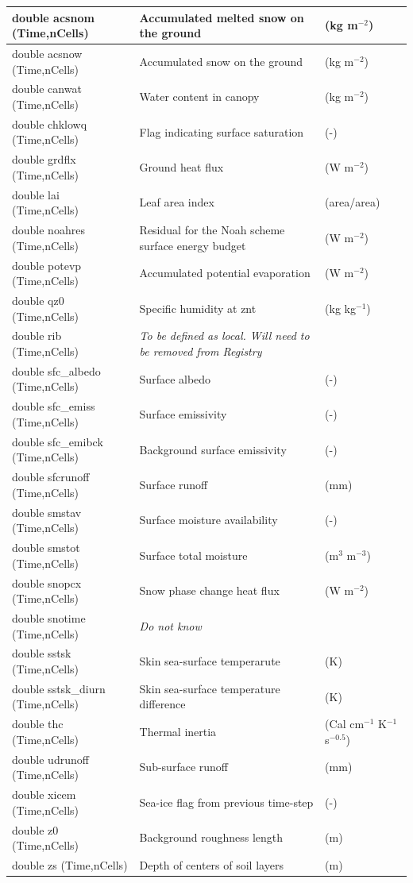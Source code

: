 \documentclass[11pt]{report}
\begin{document}
{\small
\begin{longtable}{|p{2.0in} |p{3.0in} |p{1.0in} |}
\hline
double acsnom (Time,nCells) & Accumulated melted snow on the ground  & (kg m$^{-2}$) \\ \hline
double acsnow (Time,nCells) & Accumulated snow on the ground & (kg m$^{-2}$)  \\ \hline
double canwat (Time,nCells) & Water content in canopy & (kg m$^{-2}$) \\ \hline
double chklowq (Time,nCells) & Flag indicating surface saturation & (-) \\ \hline
double grdflx (Time,nCells) & Ground heat flux & (W m$^{-2}$) \\ \hline
double lai (Time,nCells) & Leaf area index & (area/area) \\ \hline
double noahres  (Time,nCells) & Residual for the Noah scheme surface energy budget & (W m$^{-2}$) \\ \hline
double potevp  (Time,nCells) & Accumulated potential evaporation & (W m$^{-2}$) \\ \hline
double qz0  (Time,nCells) & Specific humidity at znt & (kg kg$^{-1}$) \\ \hline
double rib  (Time,nCells) & \em{To be defined as local. Will need to be removed from Registry} & \\ \hline
double sfc\_albedo  (Time,nCells) & Surface albedo & (-) \\ \hline
double sfc\_emiss (Time,nCells) & Surface emissivity & (-) \\ \hline
double sfc\_emibck  (Time,nCells) & Background surface emissivity & (-) \\ \hline
double sfcrunoff (Time,nCells) & Surface runoff & (mm) \\ \hline
double smstav (Time,nCells) & Surface moisture availability & (-) \\ \hline
double smstot (Time,nCells) & Surface total moisture &  (m$^{3}$ m$^{-3}$) \\ \hline
double snopcx (Time,nCells) & Snow phase change heat flux &  (W m$^{-2}$) \\ \hline
double snotime (Time,nCells) & \em{Do not know} & \\  \hline
double sstsk (Time,nCells) & Skin sea-surface temperarute & (K) \\ \hline
double sstsk\_diurn (Time,nCells) & Skin sea-surface temperature difference & (K) \\ \hline
double thc (Time,nCells) & Thermal inertia & (Cal cm$^{-1} $ K$^{-1} $ s$^{-0.5} $) \\ \hline
double udrunoff (Time,nCells) & Sub-surface runoff & (mm) \\ \hline
double xicem (Time,nCells) & Sea-ice flag from previous time-step & (-) \\ \hline
double z0 (Time,nCells) & Background roughness length & (m) \\ \hline
double zs (Time,nCells) & Depth of centers of soil layers & (m) \\ \hline
\end{longtable}
}
\end{document}
